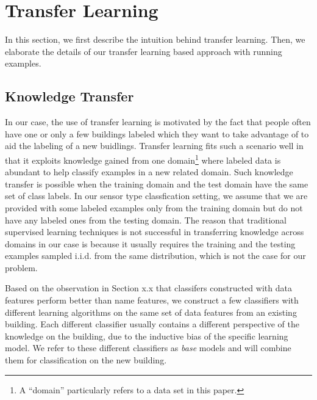 \section{Transfer Learning}
In this section, we first describe the intuition behind transfer learning.
Then, we elaborate the details of our transfer learning based approach with running examples.

\subsection{Knowledge Transfer}
In our case, the use of transfer learning is motivated by the fact that people often have one or only a few buildings labeled which they want to take advantage of to aid the labeling of a new buidlings.
Transfer learning fits such a scenario well in that it exploits knowledge gained from one domain\footnote{A ``domain'' particularly refers to a data set  in this paper.} where labeled data is abundant to help classify examples in a new related domain. 
Such knowledge transfer is possible when the training domain and the test domain have the same set of class labels. 
In our sensor type classfication setting, we assume that we are provided with some labeled examples only from the training domain but do not have any labeled ones from the testing domain. 
The reason that traditional supervised learning techniques is not successful in transferring knowledge across domains in our case is because it usually requires the training and the testing examples sampled i.i.d. from the same distribution, which is not the case for our problem.

Based on the observation in Section x.x that classifers constructed with data features perform better than name features, we construct a few classifiers with different learning algorithms on the same set of data features from an existing building. 
Each different classifier usually contains a different perspective of the knowledge on the building, due to the inductive bias of the specific learning model. 
We refer to these different classifiers as {\it base} models and will combine them for classification on the new building.

